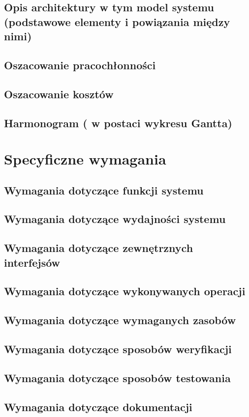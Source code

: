 \documentclass[12pt,a4paper]{report}
\begin{document}
\subsection{Opis architektury w tym model systemu (podstawowe elementy i powiązania między nimi)}
\subsection{Oszacowanie pracochłonności}
\subsection{Oszacowanie kosztów}
\subsection{Harmonogram ( w postaci wykresu Gantta)}
\section{Specyficzne wymagania}
\subsection{Wymagania dotyczące funkcji systemu}
\subsection{Wymagania dotyczące wydajności systemu}
\subsection{Wymagania dotyczące zewnętrznych interfejsów}
\subsection{Wymagania dotyczące wykonywanych operacji}
\subsection{Wymagania dotyczące wymaganych zasobów}
\subsection{Wymagania dotyczące sposobów weryfikacji}
\subsection{Wymagania dotyczące sposobów testowania}
\subsection{Wymagania dotyczące dokumentacji}
\end{document}
